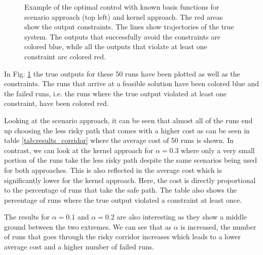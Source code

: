 \begin{figure}[htb]
{
 }
\caption{Example of the optimal control with known basis functions for scenario approach (top left) and kernel approach. The red areas show the output constraints. The lines show trajectories of the true system. The outputs that successfully avoid the constraints are colored blue, while all the outputs that violate at least one constraint are colored red.}

\label{ScenarioKernelComparisonCorridor}
\end{figure}

In Fig. \ref{ScenarioKernelComparisonCorridor} the true outputs for these 50 runs have been plotted as well as the constraints. The runs that arrive at a feasible solution have been colored blue and the failed runs, i.e. the runs where the true output violated at least one constraint, have been colored red. 

Looking at the scenario approach, it can be seen that almost all of the runs end up choosing the less risky path that comes with a higher cost as can be seen in table \ref{tab:results_corridor} where the average cost of 50 runs is shown.  In contrast, we can look at the kernel approach for $\alpha = 0.3$ where only a very small portion of the runs take the less risky path despite the same scenarios being used for both approaches. This is also reflected in the average cost which is significantly lower for the kernel approach. Here, the cost is directly proportional to the percentage of runs that take the safe path. The table also shows the percentage of runs where the true output violated a constraint at least once. 


The results for $\alpha = 0.1$ and $\alpha = 0.2$ are also interesting as they show a middle ground between the two extremes. We can see that as $\alpha$ is increased, the number of runs that goes through the risky corridor increases which leads to a lower average cost and a higher number of failed runs. 


